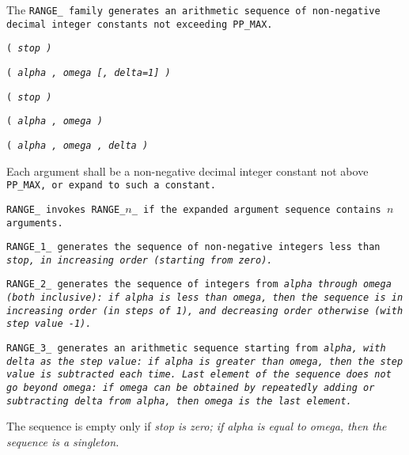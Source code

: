The \tt{RANGE_} family generates an arithmetic sequence of
non-negative decimal integer constants not exceeding \tt{PP_MAX}.


\s\s\s\tt{(} \it{stop} \tt{)}

\s\s\s\tt{(} \it{alpha} \tt{,} \it{omega} [\tt{,} \it{delta}\tt{=1}] \tt{)}

\s\tt{(} \it{stop} \tt{)}

\s\tt{(} \it{alpha} \tt{,} \it{omega} \tt{)}

\s\tt{(} \it{alpha} \tt{,} \it{omega} \phantom{[}\tt{,} \it{delta}\phantom{]} \tt{)}


Each argument shall be a non-negative decimal integer
constant not above \tt{PP_MAX}, or expand to such a constant.


\tt{RANGE_} invokes \tt{RANGE_}$n$\_ if the
expanded argument sequence contains $n$ arguments.

\tt{RANGE_1_} generates the sequence of non-negative integers
less than \it{stop}, in increasing order (starting from zero).

\tt{RANGE_2_} generates the sequence of integers from \it{alpha} through
\it{omega} (both inclusive): if \it{alpha} is less than \it{omega},
then the sequence is in increasing order (in steps of 1),
and decreasing order otherwise (with step value -1).

\tt{RANGE_3_} generates an arithmetic sequence starting from \it{alpha},
with \it{delta} as the step value: if \it{alpha} is greater
than \it{omega}, then the step value is subtracted each time.
Last element of the sequence does not go beyond \it{omega}:
if \it{omega} can be obtained by repeatedly adding or subtracting
\it{delta} from \it{alpha}, then \it{omega} is the last element.

\note The sequence is empty only if \it{stop} is zero;
if \it{alpha} is equal to \it{omega}, then the sequence is a singleton.
